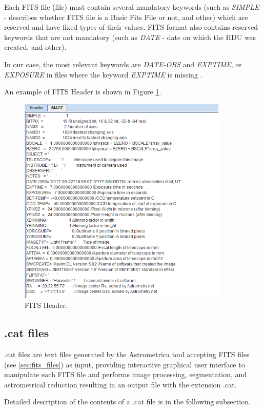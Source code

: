 	 Each FITS file (file) must contain several mandatory keywords (such as \emph{SIMPLE} - describes whether FITS file is a Basic Fits File or not, and other) which are reserved and have fixed types of their values. FITS format also contains reserved keywords that are not mandatory (such as \emph{DATE} - date on which the HDU was created, and other).
	 
	 In our case, the most relevant keywords are \emph{DATE-OBS} and \emph{EXPTIME}, or \emph{EXPOSURE} in files where the keyword \emph{EXPTIME} is missing \citep{FITSdefinition}.
	 
	 An example of FITS Header is shown in Figure \ref{fig:fits_header}.
	
	\begin{figure}[H]
	\centering
	  \includegraphics[width=10cm]{images/fits_header_example}
		  \caption{FITS Header.}
	  \label{fig:fits_header}
	\end{figure}

\subsection{.cat files}\label{sec:cat_files}
	
	.cat files are text files generated by the Astrometrica tool accepting FITS files (see \ref{sec:fits_files}) as input, providing interactive graphical user interface to manipulate each FITS file and performs image processing, segmentation, and astrometrical reduction resulting in an output file with the extension .cat.
	
	 Detailed description of the contents of a .cat file is in the following subsection.
	
